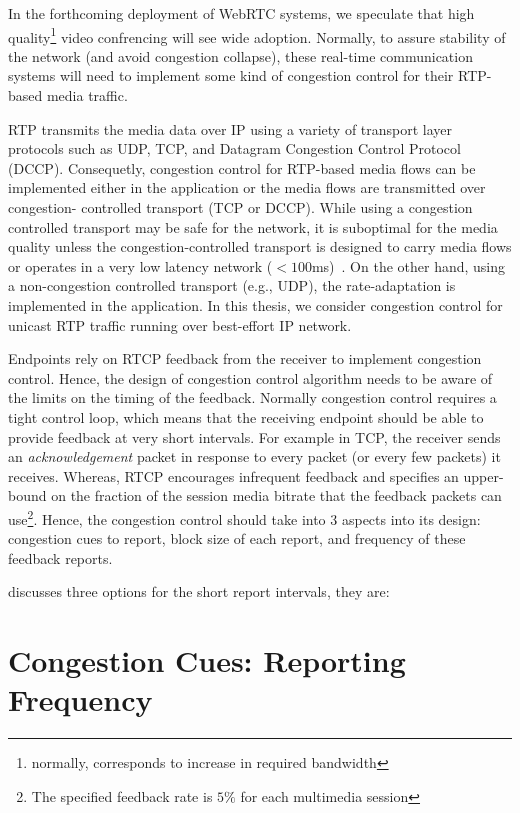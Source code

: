 In the forthcoming deployment of WebRTC systems, we speculate that high
quality\footnote{normally, corresponds to increase in required bandwidth}
video confrencing will see wide adoption. Normally, to assure stability of the
network (and avoid congestion collapse), these real-time communication systems
will need to implement some kind of congestion control for their RTP-based
media traffic.

RTP transmits the media data over IP using a variety of transport layer
protocols such as UDP, TCP, and Datagram Congestion Control Protocol (DCCP).
Consequetly, congestion control for RTP-based media flows can be implemented
either in the application or the media flows are transmitted over congestion-%
controlled transport (TCP or DCCP). While using a congestion controlled
transport may be safe for the network, it is suboptimal for the media quality
unless the congestion-controlled transport is designed to carry media flows or
operates in a very low latency network ($<100$ms)~\cite{Brosh:tcp-real-time}.
On the other hand, using a non-congestion controlled transport (e.g., UDP),
the rate-adaptation is implemented in the application.  In this thesis, we
consider congestion control for unicast RTP traffic running over best-effort
IP network.


Endpoints rely on RTCP feedback from the receiver to implement congestion
control. Hence, the design of congestion control algorithm needs to be aware
of the limits on the timing of the feedback. Normally congestion control
requires a tight control loop, which means that the receiving endpoint should
be able to provide feedback at very short intervals. For example in TCP, the
receiver sends an \emph{acknowledgement} packet in response to every packet
(or every few packets) it receives. Whereas, RTCP encourages infrequent
feedback and specifies an upper-bound on the fraction of the session media
bitrate that the feedback packets can use\footnote{The specified feedback rate
is $5\%$ for each multimedia session}. Hence, the congestion control should
take into 3 aspects into its design: congestion cues to report, block size of
each report, and frequency of these feedback reports.


\cite{draft.rmcat.feedback} discusses three options for the short report
intervals, they are:
\section{Congestion Cues: Reporting Frequency}

